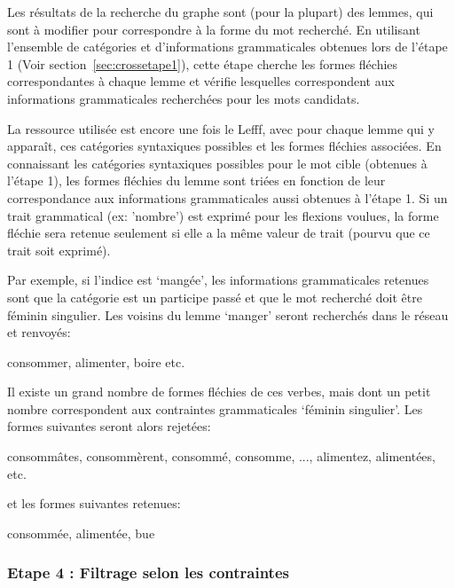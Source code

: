 {Les résultats de la recherche du graphe sont (pour la plupart) des lemmes, qui sont à modifier pour correspondre à la forme du mot recherché. En utilisant l'ensemble de catégories et d'informations grammaticales obtenues lors de l'étape 1 (Voir section~\ref{sec:crossetape1}), cette étape cherche les formes fléchies correspondantes à chaque lemme et vérifie lesquelles correspondent aux informations grammaticales recherchées pour les mots candidats.

La ressource utilisée est encore une fois le Lefff, avec pour chaque lemme qui y apparaît, ces catégories syntaxiques possibles et les formes fléchies associées. En connaissant les catégories syntaxiques possibles pour le mot cible (obtenues à l'étape 1), les formes fléchies du lemme sont triées en fonction de leur correspondance aux informations grammaticales aussi obtenues à l'étape 1. Si un trait grammatical (ex: 'nombre') est exprimé pour les flexions voulues, la forme fléchie sera retenue seulement si elle a la même valeur de trait (pourvu que ce trait soit exprimé).

Par exemple, si l'indice est \lq{mangée}\rq{}, les informations grammaticales retenues sont que la catégorie est un participe passé et que le mot recherché doit être féminin singulier. Les voisins du lemme \lq{manger}\rq{} seront recherchés dans le réseau et renvoyés:

\begin{framed}
consommer, alimenter, boire etc.
\end{framed}

Il existe un grand nombre de formes fléchies de ces verbes, mais dont un petit nombre correspondent aux contraintes grammaticales \lq{féminin singulier}\rq{}. Les formes suivantes seront alors rejetées:

\begin{framed}
consommâtes, consommèrent, consommé, consomme, ..., alimentez, alimentées, etc.
\end{framed}

et les formes suivantes retenues:

\begin{framed}
consommée, alimentée, bue
\end{framed}

\subsubsection{Etape 4 : Filtrage selon les contraintes}\label{sec:crossetape4}

}
